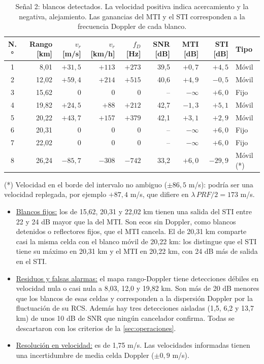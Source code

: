 \begin{table}[H]
    \centering
    \footnotesize
    \caption{Señal 2: blancos detectados. La velocidad positiva indica acercamiento y la negativa, alejamiento. Las ganancias del MTI y el STI corresponden a la frecuencia Doppler de cada blanco.}
    \label{tab:blancos}
    \begin{tabular}{|c|r|r|r|r|r|r|r|l|}
        \hline
        \textbf{N.°} & \textbf{Rango [km]} & \textbf{$v_r$ [m/s]} & \textbf{$v_r$ [km/h]} & \textbf{$f_D$ [Hz]} & \textbf{SNR [dB]} & \textbf{MTI [dB]} & \textbf{STI [dB]} & \textbf{Tipo} \\
        \hline
        1 & 8,01 & $+31{,}5$ & $+113$ & $+273$ & 39,5 & $+0{,}7$ & $+4{,}5$ & Móvil \\
        2 & 12,02 & $+59{,}4$ & $+214$ & $+515$ & 40,6 & $+4{,}9$ & $-0{,}5$ & Móvil \\
        3 & 15,62 & 0 & 0 & 0 & -- & $-\infty$ & $+6{,}0$ & Fijo \\
        4 & 19,82 & $+24{,}5$ & $+88$ & $+212$ & 42,7 & $-1{,}3$ & $+5{,}1$ & Móvil \\
        5 & 20,22 & $+43{,}7$ & $+157$ & $+379$ & 42,1 & $+3{,}1$ & $+2{,}9$ & Móvil \\
        6 & 20,31 & 0 & 0 & 0 & -- & $-\infty$ & $+6{,}0$ & Fijo \\
        7 & 22,02 & 0 & 0 & 0 & -- & $-\infty$ & $+6{,}0$ & Fijo \\
        8 & 26,24 & $-85{,}7$ & $-308$ & $-742$ & 33,2 & $+6{,}0$ & $-29{,}9$ & Móvil (*) \\
        \hline
    \end{tabular}

    \vspace{0.1cm}
    \raggedright \scriptsize (*) Velocidad en el borde del intervalo no ambiguo ($\pm 86{,}5$ m/s): podría ser una velocidad replegada, por ejemplo $+87{,}4$ m/s, que difiere en $\lambda \, PRF/2 = 173$ m/s.
\end{table}

\begin{itemize}
    \item \underline{Blancos fijos:} los de 15,62, 20,31 y 22,02 km tienen una salida del STI entre 22 y 24 dB mayor que la del MTI. Son ecos sin Doppler, como blancos detenidos o reflectores fijos, que el MTI cancela. El de 20,31 km comparte casi la misma celda con el blanco móvil de 20,22 km: los distingue que el STI tiene su máximo en 20,31 km y el MTI en 20,22 km, con 24 dB más de salida en el STI.
    \item \underline{Residuos y falsas alarmas:} el mapa rango-Doppler tiene detecciones débiles en velocidad nula o casi nula a 8,03, 12,0 y 19,82 km. Son más de 20 dB menores que los blancos de esas celdas y corresponden a la dispersión Doppler por la fluctuación de su RCS. Además hay tres detecciones aisladas (1,5, 6,2 y 13,7 km) de unos 10 dB de SNR que ningún cancelador confirma. Todas se descartaron con los criterios de la \autoref{sec:operaciones}.
    \item \underline{Resolución en velocidad:} es de 1,75 m/s. Las velocidades informadas tienen una incertidumbre de media celda Doppler ($\pm 0{,}9$ m/s).
\end{itemize}
